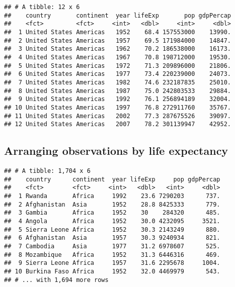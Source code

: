 \documentclass[]{article}
\newenvironment{Shaded}{\begin{snugshade}}{\end{snugshade}}
\newcommand{\KeywordTok}[1]{\textcolor[rgb]{0.13,0.29,0.53}{\textbf{#1}}}
\newcommand{\StringTok}[1]{\textcolor[rgb]{0.31,0.60,0.02}{#1}}
\newcommand{\CommentTok}[1]{\textcolor[rgb]{0.56,0.35,0.01}{\textit{#1}}}
\newcommand{\OperatorTok}[1]{\textcolor[rgb]{0.81,0.36,0.00}{\textbf{#1}}}
\newcommand{\NormalTok}[1]{#1}
\begin{document}
\begin{verbatim}
## # A tibble: 12 x 6
##    country       continent  year lifeExp       pop gdpPercap
##    <fct>         <fct>     <int>   <dbl>     <int>     <dbl>
##  1 United States Americas   1952    68.4 157553000    13990.
##  2 United States Americas   1957    69.5 171984000    14847.
##  3 United States Americas   1962    70.2 186538000    16173.
##  4 United States Americas   1967    70.8 198712000    19530.
##  5 United States Americas   1972    71.3 209896000    21806.
##  6 United States Americas   1977    73.4 220239000    24073.
##  7 United States Americas   1982    74.6 232187835    25010.
##  8 United States Americas   1987    75.0 242803533    29884.
##  9 United States Americas   1992    76.1 256894189    32004.
## 10 United States Americas   1997    76.8 272911760    35767.
## 11 United States Americas   2002    77.3 287675526    39097.
## 12 United States Americas   2007    78.2 301139947    42952.
\end{verbatim}

\subsection{Arranging observations by life
expectancy}\label{arranging-observations-by-life-expectancy}

\begin{Shaded}
\end{Shaded}

\begin{verbatim}
## # A tibble: 1,704 x 6
##    country      continent  year lifeExp     pop gdpPercap
##    <fct>        <fct>     <int>   <dbl>   <int>     <dbl>
##  1 Rwanda       Africa     1992    23.6 7290203      737.
##  2 Afghanistan  Asia       1952    28.8 8425333      779.
##  3 Gambia       Africa     1952    30    284320      485.
##  4 Angola       Africa     1952    30.0 4232095     3521.
##  5 Sierra Leone Africa     1952    30.3 2143249      880.
##  6 Afghanistan  Asia       1957    30.3 9240934      821.
##  7 Cambodia     Asia       1977    31.2 6978607      525.
##  8 Mozambique   Africa     1952    31.3 6446316      469.
##  9 Sierra Leone Africa     1957    31.6 2295678     1004.
## 10 Burkina Faso Africa     1952    32.0 4469979      543.
## # ... with 1,694 more rows
\end{verbatim}
\end{document}
